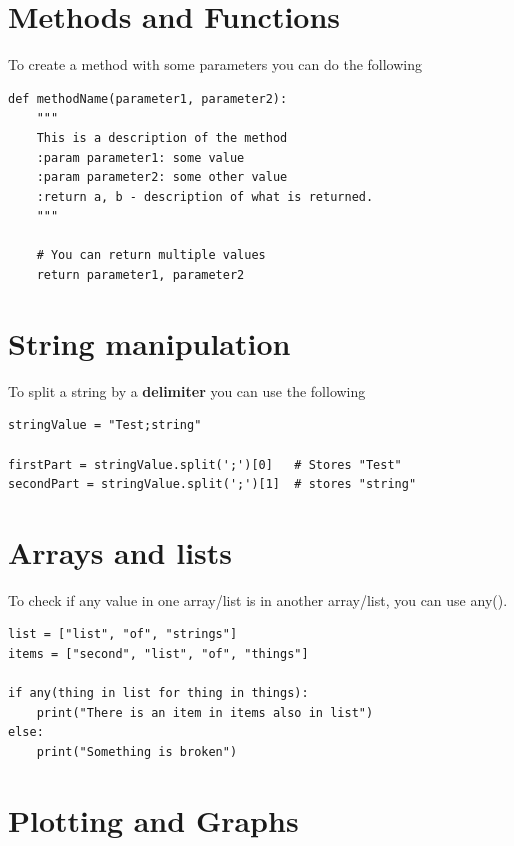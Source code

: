 \section{Methods and Functions}

To create a method with some parameters you can do the following
\begin{lstlisting}
def methodName(parameter1, parameter2):
	"""
	This is a description of the method
	:param parameter1: some value
	:param parameter2: some other value
	:return a, b - description of what is returned.
	"""
	
	# You can return multiple values
	return parameter1, parameter2	
\end{lstlisting}



\section{String manipulation}

To split a string by a \textbf{delimiter} you can use the following
\begin{lstlisting}
stringValue = "Test;string"

firstPart = stringValue.split(';')[0] 	# Stores "Test"
secondPart = stringValue.split(';')[1]	# stores "string"
\end{lstlisting}



\section{Arrays and lists}

To check if any value in one array/list is in another array/list, you can use any().
\begin{lstlisting}
list = ["list", "of", "strings"]
items = ["second", "list", "of", "things"]

if any(thing in list for thing in things):
	print("There is an item in items also in list")
else:
	print("Something is broken")
\end{lstlisting}



\section{Plotting and Graphs}

